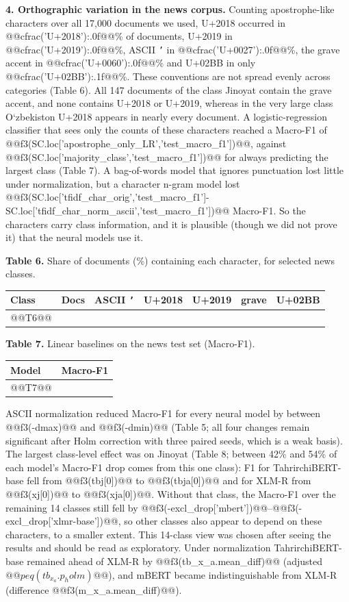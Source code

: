 \documentclass[11pt]{book}
\begin{document}
\textbf{4. Orthographic variation in the news corpus.} Counting apostrophe-like characters over all 17,000 documents we used, U+2018 occurred in @@cfrac('U+2018'):.0f@@\% of documents, U+2019 in @@cfrac('U+2019'):.0f@@\%, ASCII \texttt{'} in @@cfrac('U+0027'):.0f@@\%, the grave accent in @@cfrac('U+0060'):.0f@@\% and U+02BB in only @@cfrac('U+02BB'):.1f@@\%. These conventions are not spread evenly across categories (Table 6). All 147 documents of the class Jinoyat contain the grave accent, and none contains U+2018 or U+2019, whereas in the very large class O\textquoteleft zbekiston U+2018 appears in nearly every document. A logistic-regression classifier that sees only the counts of these characters reached a Macro-F1 of @@f3(SC.loc['apostrophe_only_LR','test_macro_f1'])@@, against @@f3(SC.loc['majority_class','test_macro_f1'])@@ for always predicting the largest class (Table 7). A bag-of-words model that ignores punctuation lost little under normalization, but a character n-gram model lost @@f3(SC.loc['tfidf_char_orig','test_macro_f1']-SC.loc['tfidf_char_norm_ascii','test_macro_f1'])@@ Macro-F1. So the characters carry class information, and it is plausible (though we did not prove it) that the neural models use it.

\begin{center}
\textbf{Table 6.} Share of documents (\%) containing each character, for selected news classes.\\[2pt]
\begin{tabular}{lrccccc}
\hline
Class & Docs & ASCII \texttt{'} & U+2018 & U+2019 & grave & U+02BB \\
\hline
@@T6@@
\hline
\end{tabular}
\end{center}

\begin{center}
\textbf{Table 7.} Linear baselines on the news test set (Macro-F1).\\[2pt]
\begin{tabular}{lc}
\hline
Model & Macro-F1 \\
\hline
@@T7@@
\hline
\end{tabular}
\end{center}

ASCII normalization reduced Macro-F1 for every neural model by between @@f3(-dmax)@@ and @@f3(-dmin)@@ (Table 5; all four changes remain significant after Holm correction with three paired seeds, which is a weak basis). The largest class-level effect was on Jinoyat (Table 8; between 42\% and 54\% of each model's Macro-F1 drop comes from this one class): F1 for TahrirchiBERT-base fell from @@f3(tbj[0])@@ to @@f3(tbja[0])@@ and for XLM-R from @@f3(xj[0])@@ to @@f3(xja[0])@@. Without that class, the Macro-F1 over the remaining 14 classes still fell by @@f3(-excl_drop['mbert'])@@--@@f3(-excl_drop['xlmr-base'])@@, so other classes also appear to depend on these characters, to a smaller extent. This 14-class view was chosen after seeing the results and should be read as exploratory. Under normalization TahrirchiBERT-base remained ahead of XLM-R by @@f3(tb_x_a.mean_diff)@@ (adjusted $@@peq(tb_x_a.p_holm)@@$), and mBERT became indistinguishable from XLM-R (difference @@f3(m_x_a.mean_diff)@@).
\end{document}
